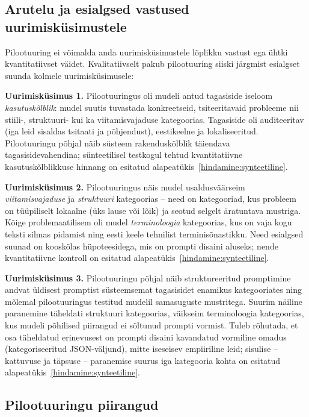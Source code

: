 \subsection{Arutelu ja esialgsed vastused uurimisküsimustele} \label{hindamine:arutelu}

Pilootuuring ei võimalda anda uurimisküsimustele lõplikku vastust ega ühtki kvantitatiivset väidet. Kvalitatiivselt pakub pilootuuring siiski järgmist esialgset suunda kolmele uurimisküsimusele:

\textbf{Uurimisküsimus 1.} Pilootuuringus oli mudeli antud tagasiside iseloom \emph{kasutuskõlblik}: mudel suutis tuvastada konkreetseid, tsiteeritavaid probleeme nii stiili-, struktuuri- kui ka viitamisvajaduse kategoorias. Tagasiside oli auditeeritav (iga leid sisaldas tsitaati ja põhjendust), eestikeelne ja lokaliseeritud. Pilootuuringu põhjal näib süsteem rakenduskõlblik täiendava tagasisidevahendina; sünteetilisel testkogul tehtud kvantitatiivne kasutuskõlblikkuse hinnang on esitatud alapeatükis~\ref{hindamine:synteetiline}.

\textbf{Uurimisküsimus 2.} Pilootuuringus näis mudel usaldusväärseim \emph{viitamisvajaduse} ja \emph{struktuuri} kategoorias -- need on kategooriad, kus probleem on tüüpiliselt lokaalne (üks lause või lõik) ja seotud selgelt äratuntava mustriga. Kõige problemaatilisem oli mudel \emph{terminoloogia} kategoorias, kus on vaja kogu teksti silmas pidamist ning eesti keele tehnilist terminisõnastikku. Need esialgsed suunad on kooskõlas hüpoteesidega, mis on prompti disaini aluseks; nende kvantitatiivne kontroll on esitatud alapeatükis~\ref{hindamine:synteetiline}.

\textbf{Uurimisküsimus 3.} Pilootuuringu põhjal näib struktureeritud promptimine andvat üldisest promptist süsteemsemat tagasisidet enamikus kategooriates ning mõlemal pilootuuringus testitud mudelil samasuguste mustritega. Suurim näiline paranemine täheldati struktuuri kategoorias, väikseim terminoloogia kategoorias, kus mudeli põhilised piirangud ei sõltunud prompti vormist. Tuleb rõhutada, et osa täheldatud erinevusest on prompti disaini kavandatud vormiline omadus (kategoriseeritud JSON-väljund), mitte iseseisev empiiriline leid; sisulise -- kattuvuse ja täpsuse -- paranemise suurus iga kategooria kohta on esitatud alapeatükis~\ref{hindamine:synteetiline}.

\subsection{Pilootuuringu piirangud} \label{hindamine:piirangud}

